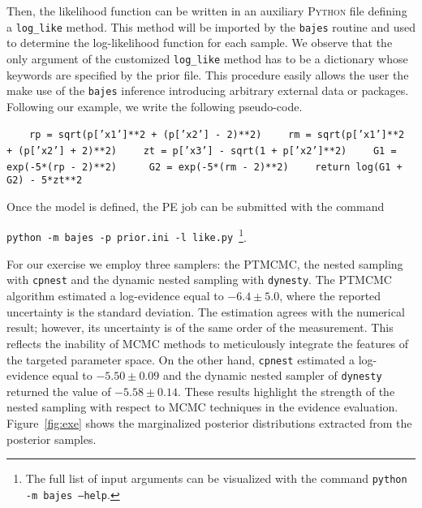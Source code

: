 \documentclass[prd,aps,twocolumn,a4paper,showkeys,nofootinbib,floatfix]{revtex4-1}
\newcommand{\bajes}{{\tt bajes}}
\newcommand{\py}{\textsc{Python}}
\begin{document}
Then, the likelihood function can be written 
in an auxiliary {\py} file
defining a {\tt log\_like} method.
This method will be imported by the {\bajes} routine and used 
to determine the log-likelihood function for each sample.
We observe that the only argument of the 
customized {\tt log\_like} method has to be a dictionary  
whose keywords are specified by the prior file.
This procedure easily allows the user the 
make use of the {\bajes} inference
introducing arbitrary external data or packages.
Following our example, we write the following pseudo-code.
		\begin{algorithm}[H]
	\caption{{\tt like.py}}
\begin{algorithmic}[1]
	\State 
	\State  $\qquad${\tt rp = sqrt(p['x1']**2 + (p['x2'] - 2)**2)}
	\State  $\qquad${\tt rm = sqrt(p['x1']**2 + (p['x2'] + 2)**2)}
	\State  $\qquad${\tt zt = p['x3'] - sqrt(1 + p['x2']**2)}
	\State  $\qquad${\tt G1 = exp(-5*(rp - 2)**2) }
	\State  $\qquad${\tt G2 = exp(-5*(rm - 2)**2)}
	\State  $\qquad${\tt return log(G1 + G2) - 5*zt**2}
\end{algorithmic}
\end{algorithm}

Once the model is defined, the PE job can be submitted
with the command
\begin{center}
	{\tt python -m bajes -p prior.ini -l like.py}\,
	\footnote{The full list
				of input arguments 
				can be visualized with 
				the command {\tt python -m bajes --help}.}.
\end{center}
For our exercise we employ three samplers:
the PTMCMC, the nested sampling with {\tt cpnest}
and the dynamic nested sampling with {\tt dynesty}.
The PTMCMC algorithm estimated a log-evidence equal to $-6.4\pm5.0$,
where the reported uncertainty is the standard deviation.
The estimation agrees with the numerical result; however, 
its uncertainty is of the same order of the measurement.
This reflects the inability of MCMC methods to meticulously integrate 
the features of the targeted parameter space.
On the other hand, 
{\tt cpnest} estimated a log-evidence equal to $-5.50\pm0.09$ and
the dynamic nested sampler of {\tt dynesty} 
returned the value of $-5.58\pm0.14$. 
These results highlight the strength of the nested sampling with respect
to MCMC techniques in the evidence evaluation.
Figure~\ref{fig:exe} shows the marginalized posterior distributions
extracted from the posterior samples. 


\end{document}
